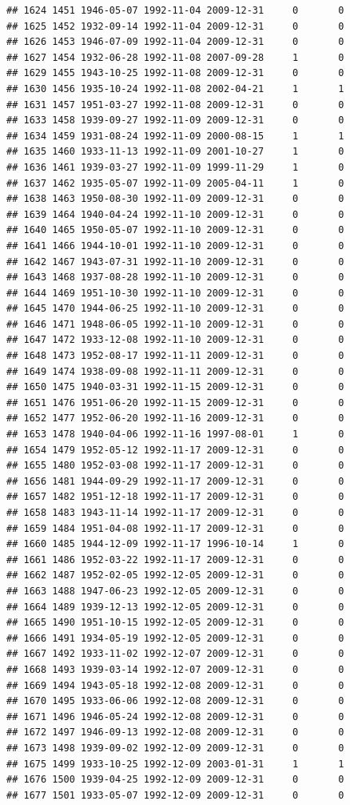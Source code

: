 \documentclass[
]{book}
\theoremstyle{definition}
\theoremstyle{definition}
\theoremstyle{definition}
\theoremstyle{definition}
\theoremstyle{remark}
\begin{document}
\begin{verbatim}
## 1624 1451 1946-05-07 1992-11-04 2009-12-31     0       0
## 1625 1452 1932-09-14 1992-11-04 2009-12-31     0       0
## 1626 1453 1946-07-09 1992-11-04 2009-12-31     0       0
## 1627 1454 1932-06-28 1992-11-08 2007-09-28     1       0
## 1629 1455 1943-10-25 1992-11-08 2009-12-31     0       0
## 1630 1456 1935-10-24 1992-11-08 2002-04-21     1       1
## 1631 1457 1951-03-27 1992-11-08 2009-12-31     0       0
## 1633 1458 1939-09-27 1992-11-09 2009-12-31     0       0
## 1634 1459 1931-08-24 1992-11-09 2000-08-15     1       1
## 1635 1460 1933-11-13 1992-11-09 2001-10-27     1       0
## 1636 1461 1939-03-27 1992-11-09 1999-11-29     1       0
## 1637 1462 1935-05-07 1992-11-09 2005-04-11     1       0
## 1638 1463 1950-08-30 1992-11-09 2009-12-31     0       0
## 1639 1464 1940-04-24 1992-11-10 2009-12-31     0       0
## 1640 1465 1950-05-07 1992-11-10 2009-12-31     0       0
## 1641 1466 1944-10-01 1992-11-10 2009-12-31     0       0
## 1642 1467 1943-07-31 1992-11-10 2009-12-31     0       0
## 1643 1468 1937-08-28 1992-11-10 2009-12-31     0       0
## 1644 1469 1951-10-30 1992-11-10 2009-12-31     0       0
## 1645 1470 1944-06-25 1992-11-10 2009-12-31     0       0
## 1646 1471 1948-06-05 1992-11-10 2009-12-31     0       0
## 1647 1472 1933-12-08 1992-11-10 2009-12-31     0       0
## 1648 1473 1952-08-17 1992-11-11 2009-12-31     0       0
## 1649 1474 1938-09-08 1992-11-11 2009-12-31     0       0
## 1650 1475 1940-03-31 1992-11-15 2009-12-31     0       0
## 1651 1476 1951-06-20 1992-11-15 2009-12-31     0       0
## 1652 1477 1952-06-20 1992-11-16 2009-12-31     0       0
## 1653 1478 1940-04-06 1992-11-16 1997-08-01     1       0
## 1654 1479 1952-05-12 1992-11-17 2009-12-31     0       0
## 1655 1480 1952-03-08 1992-11-17 2009-12-31     0       0
## 1656 1481 1944-09-29 1992-11-17 2009-12-31     0       0
## 1657 1482 1951-12-18 1992-11-17 2009-12-31     0       0
## 1658 1483 1943-11-14 1992-11-17 2009-12-31     0       0
## 1659 1484 1951-04-08 1992-11-17 2009-12-31     0       0
## 1660 1485 1944-12-09 1992-11-17 1996-10-14     1       0
## 1661 1486 1952-03-22 1992-11-17 2009-12-31     0       0
## 1662 1487 1952-02-05 1992-12-05 2009-12-31     0       0
## 1663 1488 1947-06-23 1992-12-05 2009-12-31     0       0
## 1664 1489 1939-12-13 1992-12-05 2009-12-31     0       0
## 1665 1490 1951-10-15 1992-12-05 2009-12-31     0       0
## 1666 1491 1934-05-19 1992-12-05 2009-12-31     0       0
## 1667 1492 1933-11-02 1992-12-07 2009-12-31     0       0
## 1668 1493 1939-03-14 1992-12-07 2009-12-31     0       0
## 1669 1494 1943-05-18 1992-12-08 2009-12-31     0       0
## 1670 1495 1933-06-06 1992-12-08 2009-12-31     0       0
## 1671 1496 1946-05-24 1992-12-08 2009-12-31     0       0
## 1672 1497 1946-09-13 1992-12-08 2009-12-31     0       0
## 1673 1498 1939-09-02 1992-12-09 2009-12-31     0       0
## 1675 1499 1933-10-25 1992-12-09 2003-01-31     1       1
## 1676 1500 1939-04-25 1992-12-09 2009-12-31     0       0
## 1677 1501 1933-05-07 1992-12-09 2009-12-31     0       0
\end{verbatim}
\end{document}
